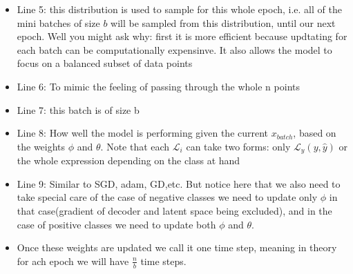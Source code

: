 \documentclass{article}
\begin{document}
\begin{itemize}
\item Line 5: this distribution is used to sample for this whole epoch, i.e. all of the mini batches of size $b$ will be sampled from this distribution, until our next epoch. Well you might ask why: first it is more efficient because updtating for each batch can be computationally expensinve. It also allows the model to focus on a balanced subset of data points
\item Line 6: To mimic the feeling of passing through the whole n points
\item Line 7: this batch is of size b
\item Line 8: How well the model is performing given the current $x_{batch}$, based on the weights $\phi$ and $\theta$. Note that each $\mathcal{L}_i$ can take two forms: only $\mathcal{L}_y(y,\hat{y})$ or the whole expression depending on the class at hand
\item Line 9: Similar to SGD, adam, GD,etc. But notice here that we also need to take special care of the case of negative classes we need to update only $\phi$ in that case(gradient of decoder and latent space being excluded), and in the case of positive classes we need to update both $\phi$ and $\theta$.
\item Once these weights are updated we call it one time step, meaning in theory for ach epoch we will have $\frac{n}{b}$ time steps.
\end{itemize}
\end{document}
